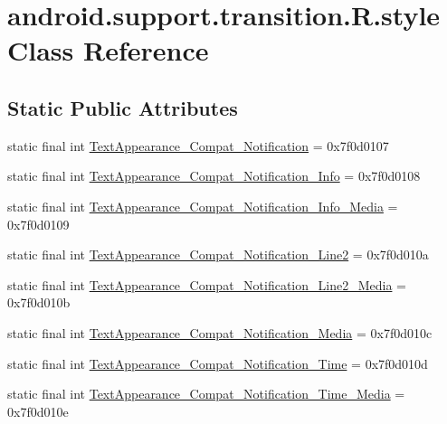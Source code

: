 \hypertarget{classandroid_1_1support_1_1transition_1_1R_1_1style}{}\section{android.\+support.\+transition.\+R.\+style Class Reference}
\label{classandroid_1_1support_1_1transition_1_1R_1_1style}
\subsection*{Static Public Attributes}
\begin{DoxyCompactItemize}
\item 
static final int \mbox{\hyperlink{classandroid_1_1support_1_1transition_1_1R_1_1style_ae96b82f217c7c9c896b2ade781c0a3bc}{Text\+Appearance\+\_\+\+Compat\+\_\+\+Notification}} = 0x7f0d0107
\item 
static final int \mbox{\hyperlink{classandroid_1_1support_1_1transition_1_1R_1_1style_a4ab9fe59305f96da76de5fd9adee7571}{Text\+Appearance\+\_\+\+Compat\+\_\+\+Notification\+\_\+\+Info}} = 0x7f0d0108
\item 
static final int \mbox{\hyperlink{classandroid_1_1support_1_1transition_1_1R_1_1style_ac6e69756326cda1ab733113013e0729c}{Text\+Appearance\+\_\+\+Compat\+\_\+\+Notification\+\_\+\+Info\+\_\+\+Media}} = 0x7f0d0109
\item 
static final int \mbox{\hyperlink{classandroid_1_1support_1_1transition_1_1R_1_1style_ae783c72e586eabfa59bfa1f121cd1ee7}{Text\+Appearance\+\_\+\+Compat\+\_\+\+Notification\+\_\+\+Line2}} = 0x7f0d010a
\item 
static final int \mbox{\hyperlink{classandroid_1_1support_1_1transition_1_1R_1_1style_a9da11ee29323e0497d9687627c803c13}{Text\+Appearance\+\_\+\+Compat\+\_\+\+Notification\+\_\+\+Line2\+\_\+\+Media}} = 0x7f0d010b
\item 
static final int \mbox{\hyperlink{classandroid_1_1support_1_1transition_1_1R_1_1style_a1b233cb48beeee074351c51822e55fe8}{Text\+Appearance\+\_\+\+Compat\+\_\+\+Notification\+\_\+\+Media}} = 0x7f0d010c
\item 
static final int \mbox{\hyperlink{classandroid_1_1support_1_1transition_1_1R_1_1style_aa3e98d1d135f8b68504e915e4e37e075}{Text\+Appearance\+\_\+\+Compat\+\_\+\+Notification\+\_\+\+Time}} = 0x7f0d010d
\item 
static final int \mbox{\hyperlink{classandroid_1_1support_1_1transition_1_1R_1_1style_ab69500ed5556434cbd64579b1745363c}{Text\+Appearance\+\_\+\+Compat\+\_\+\+Notification\+\_\+\+Time\+\_\+\+Media}} = 0x7f0d010e

\end{DoxyCompactItemize}
